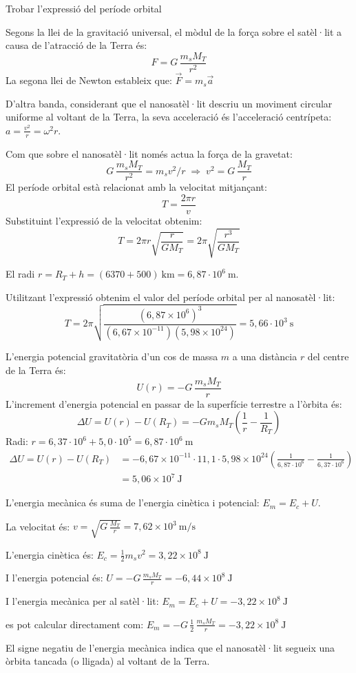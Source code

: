 \begin{solapartat}
Trobar l'expressió del període orbital

 Segons la llei de la gravitació universal, el mòdul de la força sobre el satèl·lit a causa de l'atracció de la Terra és:
\[ F = G\,\frac{m_s M_T}{r^2} \]
La segona llei de Newton estableix que: $\vec{F} = m_s\vec{a}$

D'altra banda, considerant que el nanosatèl·lit descriu un moviment circular uniforme al voltant de la Terra, la seva acceleració és l'acceleració centrípeta: $a = \frac{v^2}{r} = \omega^2 r$.

Com que sobre el nanosatèl·lit només actua la força de la gravetat:
\[ G\,\frac{m_s M_T}{r^2} = m_s v^2/r \;\Rightarrow\; v^2 = G\,\frac{M_T}{r} \]
El període orbital està relacionat amb la velocitat mitjançant:
\[ T = \frac{2\pi r}{v} \]
Substituint l'expressió de la velocitat obtenim:
\[ T = 2\pi r\sqrt{\frac{r}{G M_T}} = 2\pi\sqrt{\frac{r^3}{G M_T}} \]

 El radi $r = R_T + h = (6370 + 500)\ \mathrm{km} = 6,87\cdot 10^{6}\ \mathrm{m}$.

Utilitzant l'expressió obtenim el valor del període orbital per al nanosatèl·lit:
\[ T = 2\pi\sqrt{\frac{(6,87\times 10^{6})^3}{(6,67\times 10^{-11})(5,98\times 10^{24})}} = 5,66\cdot 10^{3}\ \mathrm{s} \]
\end{solapartat}

\begin{solapartat}
 L'energia potencial gravitatòria d'un cos de massa $m$ a una distància $r$ del centre de la Terra és:
\[ U(r) = -G\,\frac{m_s M_T}{r} \]
L'increment d'energia potencial en passar de la superfície terrestre a l'òrbita és:
\[ \Delta U = U(r) - U(R_T) = -G m_s M_T\left(\frac{1}{r} - \frac{1}{R_T}\right) \]
Radi: $r = 6,37\cdot 10^{6} + 5,0\cdot 10^{5} = 6,87\cdot 10^{6}\ \mathrm{m}$
\begin{align*}
\Delta U = U(r) - U(R_T) &= -6,67\times 10^{-11}\cdot 11,1\cdot 5,98\times 10^{24}\left(\frac{1}{6,87\cdot 10^{6}} - \frac{1}{6,37\cdot 10^{6}}\right)\\
&= 5,06\times 10^{7}\ \mathrm{J}
\end{align*}

 L'energia mecànica és suma de l'energia cinètica i potencial: $E_m = E_c + U$.

La velocitat és: $v = \sqrt{G\,\frac{M_T}{r}} = 7,62\times 10^{3}\ \mathrm{m/s}$

L'energia cinètica és: $E_c = \frac{1}{2} m_s v^2 = 3,22\times 10^{8}\ \mathrm{J}$

I l'energia potencial és: $U = -G\,\frac{m_s M_T}{r} = -6,44\times 10^{8}\ \mathrm{J}$

I l'energia mecànica per al satèl·lit: $E_m = E_c + U = -3,22\times 10^{8}\ \mathrm{J}$

 es pot calcular directament com: $E_m = -G\,\frac{1}{2}\,\frac{m_s M_T}{r} = -3,22\times 10^{8}\ \mathrm{J}$

 El signe negatiu de l'energia mecànica indica que el nanosatèl·lit segueix una òrbita tancada (o lligada) al voltant de la Terra.
\end{solapartat}
